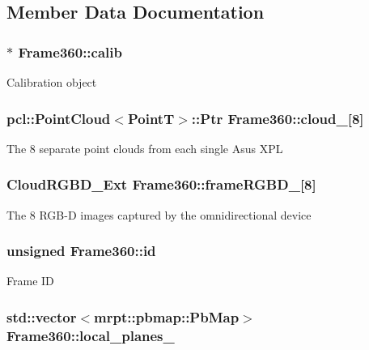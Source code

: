 \subsection{Member Data Documentation}
\hypertarget{classFrame360_a0330337be3a74f374edd0c9a75af4801}{
\subsubsection[{calib}]{$\ast$ Frame360\-::calib\hspace{0.3cm}{\ttfamily [private]}}}\label{classFrame360_a0330337be3a74f374edd0c9a75af4801}
Calibration object \hypertarget{classFrame360_adcbb97176838c11959584d7b1e136cf4}{
\subsubsection[{cloud\-\_\-}]{\setlength{\rightskip}{0pt plus 5cm}pcl\-::\-Point\-Cloud$<$Point\-T$>$\-::Ptr Frame360\-::cloud\-\_\-\mbox{[}8\mbox{]}\hspace{0.3cm}{\ttfamily [private]}}}\label{classFrame360_adcbb97176838c11959584d7b1e136cf4}
The 8 separate point clouds from each single Asus X\-P\-L \hypertarget{classFrame360_a25db1945d153eb9c62b4ad432a7098f0}{
\subsubsection[{frame\-R\-G\-B\-D\-\_\-}]{\setlength{\rightskip}{0pt plus 5cm}Cloud\-R\-G\-B\-D\-\_\-\-Ext Frame360\-::frame\-R\-G\-B\-D\-\_\-\mbox{[}8\mbox{]}}}\label{classFrame360_a25db1945d153eb9c62b4ad432a7098f0}
The 8 R\-G\-B-\/\-D images captured by the omnidirectional device \hypertarget{classFrame360_a05b50a6279ddaa8b681bfb211bdc35b9}{
\subsubsection[{id}]{\setlength{\rightskip}{0pt plus 5cm}unsigned Frame360\-::id}}\label{classFrame360_a05b50a6279ddaa8b681bfb211bdc35b9}
Frame I\-D \hypertarget{classFrame360_a697364d4a26a27eecf5206cccd5885bc}{
\subsubsection[{local\-\_\-planes\-\_\-}]{\setlength{\rightskip}{0pt plus 5cm}std\-::vector$<$mrpt\-::pbmap\-::\-Pb\-Map$>$ Frame360\-::local\-\_\-planes\-\_\-}}\label{classFrame360_a697364d4a26a27eecf5206cccd5885bc}
